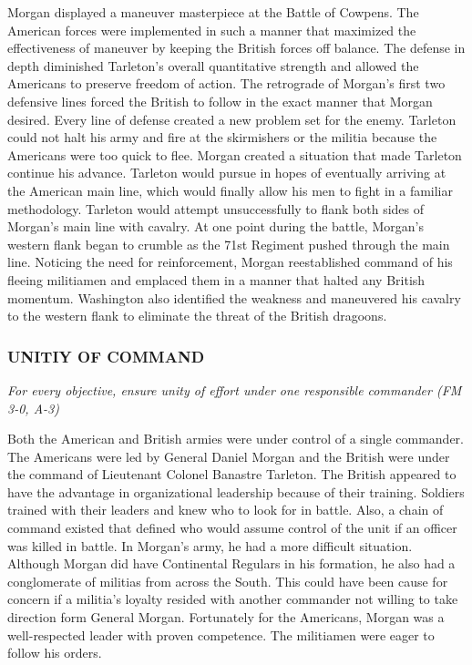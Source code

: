Morgan displayed a maneuver masterpiece at the Battle of Cowpens.  The American
forces were implemented in such a manner that maximized the effectiveness of
maneuver by keeping the British forces off balance.  The defense in depth
diminished Tarleton’s overall quantitative strength and allowed the Americans
to preserve freedom of action.  The retrograde of Morgan’s first two defensive
lines forced the British to follow in the exact manner that Morgan desired.
Every line of defense created a new problem set for the enemy.  Tarleton could
not halt his army and fire at the skirmishers or the militia because the
Americans were too quick to flee.  Morgan created a situation that made
Tarleton continue his advance.  Tarleton would pursue in hopes of eventually
arriving at the American main line, which would finally allow his men to fight
in a familiar methodology.   Tarleton would attempt unsuccessfully to flank
both sides of Morgan’s main line with cavalry.  At one point during the battle,
Morgan’s western flank began to crumble as the 71st Regiment pushed through the
main line.  Noticing the need for reinforcement, Morgan reestablished command
of his fleeing militiamen and emplaced them in a manner that halted any British
momentum.  Washington also identified the weakness and maneuvered his cavalry
to the western flank to eliminate the threat of the British dragoons.  

\subsubsection{UNITIY OF COMMAND}

\textit{For every objective, ensure unity of effort under one responsible
commander (FM 3-0, A-3)}

Both the American and British armies were under control of a single commander.
The Americans were led by General Daniel Morgan and the British were under the
command of Lieutenant Colonel Banastre Tarleton.  The British appeared to have
the advantage in organizational leadership because of their training.  Soldiers
trained with their leaders and knew who to look for in battle. Also, a chain of
command existed that defined who would assume control of the unit if an officer
was killed in battle.  In Morgan’s army, he had a more difficult situation.
Although Morgan did have Continental Regulars in his formation, he also had a
conglomerate of militias from across the South.  This could have been cause for
concern if a militia’s loyalty resided with another commander not willing to
take direction form General Morgan.  Fortunately for the Americans, Morgan was
a well-respected leader with proven competence.  The militiamen were eager to
follow his orders.     

